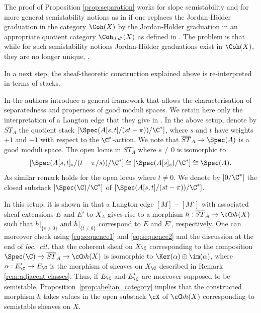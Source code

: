 \begin{rem}\label{rem:proof-of-separation}
The proof of Proposition \ref{prop:separation} works for slope semistability and for more general semistability notions as in \cite[Def.\,2.2]{TomaCriteria} if one replaces the Jordan-Hölder graduation in the category $\Coh(X)$ by the Jordan-Hölder graduation in an appropriate quotient category $\Coh_{d,d'}(X)$ as defined in \cite{HL}. The problem is that while for such semistability notions Jordan-Hölder graduations exist in $\Coh(X)$, they are no longer unique, \cite[Prop.\,2.1]{BuTeTo1bis}.
\end{rem}

In a next step, the sheaf-theoretic construction explained above is re-interpreted in terms of stacks.

\begin{rem}\label{rem:AHLH}
In \cite[\S 3.5]{AHLH} the authors introduce a general framework that allows the characterisation of separatedness and properness of good moduli spaces. We retain here only the interpretation of a Langton edge that they give in
\cite[Rem.\,3.36]{AHLH}. In the above setup, denote by $\overline{ST}_A$ the quotient stack \hbox{$[\Spec (A[s,t]/(st-\pi))/\C^*]$}, where $s$ and $t$ have weights $+1$ and $-1$ with respect to the $\C^*$-action. We note that $\overline{ST}_A\to \Spec (A)$ is a good moduli space. The open locus in $\overline{ST}_A$ where $s\neq0$ is isomorphic to\enlargethispage{\baselineskip}%
\[
[\Spec(A[s,t]_s/(t-\pi/s))/\C^*]\cong [\Spec(A[s]_s)/\C^*]\cong \Spec(A).
\]
As similar remark holds for the open locus where $t \neq 0$. We denote by $[0/\C^*]$ the closed substack $[\Spec(\C)/\C^*]$ of $[\Spec(A[s,t]/(st-\pi))/\C^*]$.

In this setup, it is shown in \cite[Rem.\,3.36]{AHLH} that a Langton edge $[M] -[M']$ with associated sheaf extensions $E$ and $E'$ to $X_A$ gives rise to a morphism $h:\overline{ST}_A\to\cC\!oh(X)$ such that $h|_{\{s\neq0\}}$ and $h|_{\{t\neq0\}}$ correspond to $E$ and $E'$, respectively. One can moreover check using \eqref{eq:sequence1} and \eqref{eq:sequence2} and the discussion at the end of \emph{loc.~cit.} that the coherent sheaf on $X_\C$ corresponding to the composition $\Spec(\C)\to \overline{ST}_A\to\cC\!oh(X)$ is isomorphic to $\Ker(\alpha)\oplus\im(\alpha)$, where $\alpha: E'_\C\to E_\C$ is the morphism of sheaves on $X_\C$ described in Remark \ref{rem:adjacent classes}. Thus, if $E_\C$ and $E'_\C$ are moreover supposed to be semistable, Proposition~\ref{prop:abelian_category} implies that the constructed morphism $h$ takes values in the open substack $\cX$ of $\cC\!oh(X)$ corresponding to semistable sheaves on $X$.
\end{rem}

